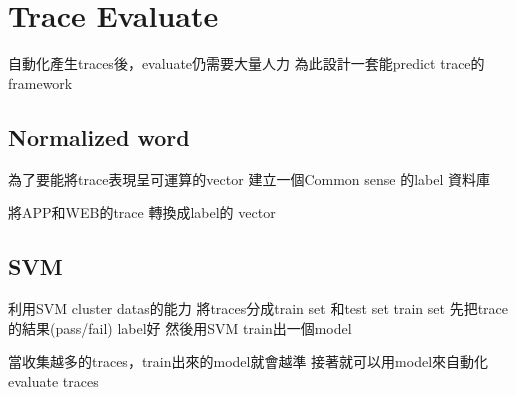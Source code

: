 
\chapter{Trace Evaluate}\label{ch:traceEvaluate}

自動化產生traces後，evaluate仍需要大量人力
為此設計一套能predict trace的framework

\section{Normalized word}

為了要能將trace表現呈可運算的vector
建立一個Common sense 的label 資料庫

將APP和WEB的trace 轉換成label的 vector

\section{SVM}

利用SVM cluster datas的能力
將traces分成train set 和test set
train set 先把trace的結果(pass/fail) label好
然後用SVM train出一個model

當收集越多的traces，train出來的model就會越準
接著就可以用model來自動化evaluate traces
